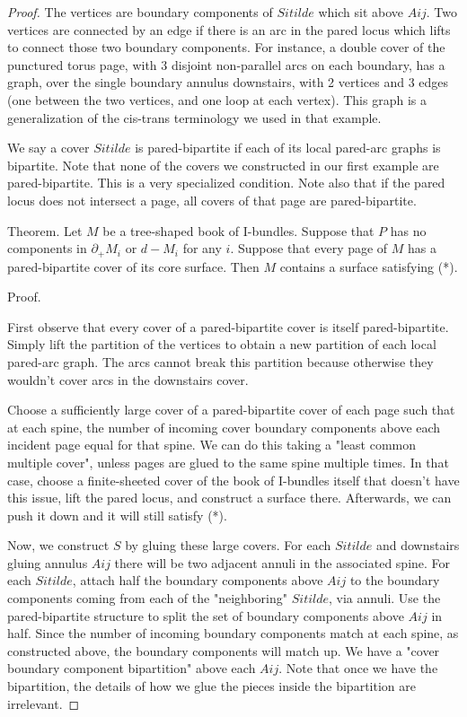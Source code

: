 \documentclass[12pt]{amsart}
\theoremstyle{definition}
\newcommand{\bd}{\partial}
\begin{document}
\begin{proof}
The vertices are boundary components of $Sitilde$ which sit above $Aij$. Two
vertices are connected by an edge if there is an arc in the pared locus which
lifts to connect those two boundary components. For instance, a double cover of
the punctured torus page, with 3 disjoint non-parallel arcs on each boundary,
has a graph, over the single boundary annulus downstairs,  with 2 vertices and
3 edges (one between the two vertices, and one loop at each vertex). This graph
is a generalization of the cis-trans terminology we used in that example.

We say a cover $Sitilde$ is pared-bipartite if each of its local pared-arc
graphs is bipartite. Note that none of the covers we constructed in our first
example are pared-bipartite. This is a very specialized condition. Note also
that if the pared locus does not intersect a page, all covers of that page are
pared-bipartite.

Theorem. Let $M$ be a tree-shaped book of I-bundles. Suppose that $P$ has no
components in $\bd_+M_i$ or $d-M_i$ for any $i$. Suppose that every page of $M$ has
a pared-bipartite cover of its core surface. Then $M$ contains a surface
satisfying (*).

Proof.

First observe that every cover of a pared-bipartite cover is itself
pared-bipartite. Simply lift the partition of the vertices to obtain a new
partition of each local pared-arc graph. The arcs cannot break this
partition because otherwise they wouldn't cover arcs in the downstairs cover.

Choose a sufficiently large cover of a pared-bipartite cover of each page such
that at each spine, the number of incoming cover boundary components above each
incident page equal for that spine. We can do this taking a "least common
multiple cover", unless pages are glued to the same spine multiple times. In
that case, choose a finite-sheeted cover of the book of I-bundles itself that
doesn't have this issue, lift the pared locus, and construct a surface there.
Afterwards, we can push it down and it will still satisfy (*).

Now, we construct $S$ by gluing these large covers. For each $Sitilde$ and
downstairs gluing annulus $Aij$ there will be two adjacent annuli in the
associated spine. For each $Sitilde$, attach half the boundary components above
$Aij$ to the boundary components coming from each of the "neighboring"
$Sitilde$,
via annuli. Use the pared-bipartite structure to split the set of boundary
components above $Aij$ in half. Since the number of incoming boundary components
match at each spine, as constructed above, the boundary components will match
up. We have a "cover boundary component bipartition" above each $Aij$. Note that
once we have the bipartition, the details of how we glue the pieces inside the
bipartition are irrelevant.


\end{proof}
\end{document}
